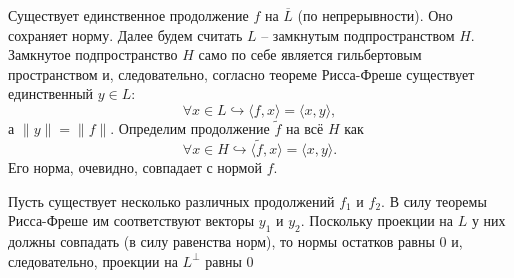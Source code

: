 \begin{solution}
    Существует единственное продолжение $f$ на $\overline{L}$ (по непрерывности).
    Оно сохраняет норму.
    Далее будем считать $L$ -- замкнутым подпространством $H$.
    Замкнутое подпространство $H$ само по себе является гильбертовым пространством и, следовательно, согласно теореме Рисса-Фреше существует единственный $y \in L\colon$
    \[
        \forall x \in L\hookrightarrow \langle f, x \rangle = \langle x, y \rangle,
    \]
    а $\|y\| = \|f\|$.
    Определим продолжение $\tilde{f}$ на всё $H$ как
    \[
        \forall x \in H \hookrightarrow \langle \tilde{f}, x \rangle = \langle x, y \rangle.
    \]
    Его норма, очевидно, совпадает с нормой $f$.

    Пусть существует несколько различных продолжений $f_1$ и $f_2$.
    В силу теоремы Рисса-Фреше им соответствуют векторы $y_1$ и $y_2$.
    Поскольку проекции на $L$ у них должны совпадать (в силу равенства норм), то нормы остатков равны $0$ и, следовательно, проекции на $L^{\perp}$ равны $0$
\end{solution}
